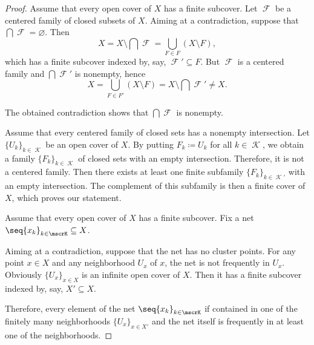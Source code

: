 \begin{proof}
   Assume that every open cover of \( X \) has a finite subcover. Let \( \mscrF \) be a centered family of closed subsets of \( X \). Aiming at a contradiction, suppose that \( \bigcap \mscrF = \varnothing \). Then
  \begin{equation*}
    X
    =
    X \setminus \bigcap \mscrF
    =
    \bigcup_{F \in F} (X \setminus F),
  \end{equation*}
  which has a finite subcover indexed by, say, \( \mscrF' \subseteq F \). But \( \mscrF \) is a centered family and \( \bigcap \mscrF' \) is nonempty, hence
  \begin{equation*}
    X
    =
    \bigcup_{F \in F'} (X \setminus F)
    =
    X \setminus \bigcap \mscrF'
    \neq
    X.
  \end{equation*}

  The obtained contradiction shows that \( \bigcap \mscrF \) is nonempty.

   Assume that every centered family of closed sets has a nonempty intersection. Let \( \{ U_k \}_{k \in \mscrK} \) be an open cover of \( X \). By putting \( F_k \coloneqq U_k \) for all \( k \in \mscrK \), we obtain a family \( \{ F_k \}_{k \in \mscrK} \) of closed sets with an empty intersection. Therefore, it is not a centered family. Then there exists at least one finite subfamily \( \{ F_k \}_{k \in \mscrK'} \) with an empty intersection. The complement of this subfamily is then a finite cover of \( X \), which proves our statement.

   Assume that every open cover of \( X \) has a finite subcover. Fix a net \( \seq{ x_k }_{k \in \mscrK} \subseteq X \).

  Aiming at a contradiction, suppose that the net has no cluster points. For any point \( x \in X \) and any neighborhood \( U_x \) of \( x \), the net is not frequently in \( U_x \). Obviously \( \{ U_x \}_{x \in X} \) is an infinite open cover of \( X \). Then it has a finite subcover indexed by, say, \( X' \subseteq X \).

  Therefore, every element of the net \( \seq{ x_k }_{k \in \mscrK} \) if contained in one of the finitely many neighborhoods \( \{ U_x \}_{x \in X'} \) and the net itself is frequently in at least one of the neighborhoods.


\end{proof}
